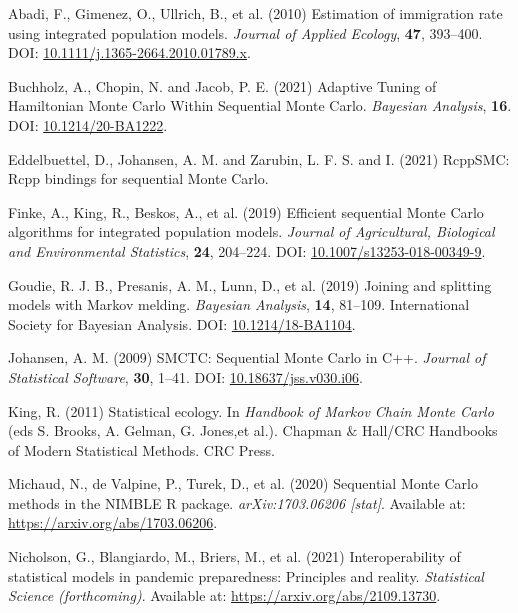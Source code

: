 \documentclass[
  10pt,
  a4paper,
]{article}
\newlength{\cslhangindent}
\newlength{\cslentryspacingunit} %
\newenvironment{CSLReferences}[2] %
 {%
  \setlength{\parindent}{0pt}
  \ifodd #1
  \let\oldpar\par
  \def\par{\hangindent=\cslhangindent\oldpar}
  \fi
  \setlength{\parskip}{#2\cslentryspacingunit}
 }%
 {}
\begin{document}
\hypertarget{refs}{}
\begin{CSLReferences}{1}{0}
\leavevmode{}%
Abadi, F., Gimenez, O., Ullrich, B., et al. (2010) Estimation of
immigration rate using integrated population models. \emph{Journal of
Applied Ecology}, \textbf{47}, 393--400. DOI:
\href{https://doi.org/10.1111/j.1365-2664.2010.01789.x}{10.1111/j.1365-2664.2010.01789.x}.

\leavevmode{}%
Buchholz, A., Chopin, N. and Jacob, P. E. (2021) Adaptive {Tuning} of
{Hamiltonian Monte Carlo Within Sequential Monte Carlo}. \emph{Bayesian
Analysis}, \textbf{16}. DOI:
\href{https://doi.org/10.1214/20-BA1222}{10.1214/20-BA1222}.

\leavevmode{}%
Eddelbuettel, D., Johansen, A. M. and Zarubin, L. F. S. and I. (2021)
{RcppSMC}: {Rcpp} bindings for sequential {Monte Carlo}.

\leavevmode{}%
Finke, A., King, R., Beskos, A., et al. (2019) Efficient sequential
{Monte Carlo} algorithms for integrated population models. \emph{Journal
of Agricultural, Biological and Environmental Statistics}, \textbf{24},
204--224. DOI:
\href{https://doi.org/10.1007/s13253-018-00349-9}{10.1007/s13253-018-00349-9}.

\leavevmode{}%
Goudie, R. J. B., Presanis, A. M., Lunn, D., et al. (2019) Joining and
splitting models with {Markov} melding. \emph{Bayesian Analysis},
\textbf{14}, 81--109. {International Society for Bayesian Analysis}.
DOI: \href{https://doi.org/10.1214/18-BA1104}{10.1214/18-BA1104}.

\leavevmode{}%
Johansen, A. M. (2009) {SMCTC}: {Sequential Monte Carlo} in {C}++.
\emph{Journal of Statistical Software}, \textbf{30}, 1--41. DOI:
\href{https://doi.org/10.18637/jss.v030.i06}{10.18637/jss.v030.i06}.

\leavevmode{}%
King, R. (2011) Statistical ecology. In \emph{Handbook of {Markov Chain
Monte Carlo}} (eds S. Brooks, A. Gelman, G. Jones,et al.). Chapman
{\(\&\)} {Hall}/{CRC Handbooks} of {Modern Statistical Methods}. {CRC
Press}.

\leavevmode{}%
Michaud, N., de Valpine, P., Turek, D., et al. (2020) Sequential {Monte
Carlo} methods in the {NIMBLE R} package. \emph{arXiv:1703.06206
{[}stat{]}}. Available at: \url{https://arxiv.org/abs/1703.06206}.

\leavevmode{}%
Nicholson, G., Blangiardo, M., Briers, M., et al. (2021)
Interoperability of statistical models in pandemic preparedness:
Principles and reality. \emph{Statistical Science (forthcoming)}.
Available at: \url{https://arxiv.org/abs/2109.13730}.

\end{CSLReferences}
\end{document}
